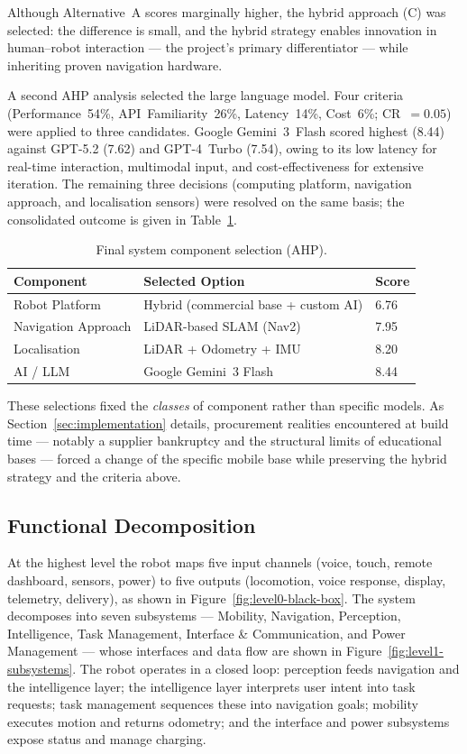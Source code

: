 \documentclass[11pt,a4paper]{article}
\begin{document}
\noindent Although Alternative~A scores marginally higher, the hybrid approach (C) was selected: the difference is small, and the hybrid strategy enables innovation in human--robot interaction --- the project's primary differentiator --- while inheriting proven navigation hardware.

A second AHP analysis selected the large language model. Four criteria (Performance~54\%, API~Familiarity~26\%, Latency~14\%, Cost~6\%; CR~$=0.05$) were applied to three candidates. Google Gemini~3~Flash scored highest (8.44) against GPT-5.2 (7.62) and GPT-4~Turbo (7.54), owing to its low latency for real-time interaction, multimodal input, and cost-effectiveness for extensive iteration. The remaining three decisions (computing platform, navigation approach, and localisation sensors) were resolved on the same basis; the consolidated outcome is given in Table~\ref{tab:ahp_summary}.

\begin{table}[H]
\centering
\caption{Final system component selection (AHP).}
\label{tab:ahp_summary}
\begin{tabular}{lll}
\toprule
\textbf{Component} & \textbf{Selected Option} & \textbf{Score} \\
\midrule
Robot Platform      & Hybrid (commercial base + custom AI) & 6.76 \\
Navigation Approach & LiDAR-based SLAM (Nav2)               & 7.95 \\
Localisation        & LiDAR + Odometry + IMU               & 8.20 \\
AI / LLM            & Google Gemini~3 Flash                & 8.44 \\
\bottomrule
\end{tabular}
\end{table}

\noindent These selections fixed the \emph{classes} of component rather than specific models. As Section~\ref{sec:implementation} details, procurement realities encountered at build time --- notably a supplier bankruptcy and the structural limits of educational bases --- forced a change of the specific mobile base while preserving the hybrid strategy and the criteria above.

\subsection{Functional Decomposition}
At the highest level the robot maps five input channels (voice, touch, remote dashboard, sensors, power) to five outputs (locomotion, voice response, display, telemetry, delivery), as shown in Figure~\ref{fig:level0-black-box}. The system decomposes into seven subsystems --- Mobility, Navigation, Perception, Intelligence, Task Management, Interface \& Communication, and Power Management --- whose interfaces and data flow are shown in Figure~\ref{fig:level1-subsystems}. The robot operates in a closed loop: perception feeds navigation and the intelligence layer; the intelligence layer interprets user intent into task requests; task management sequences these into navigation goals; mobility executes motion and returns odometry; and the interface and power subsystems expose status and manage charging.
\end{document}
